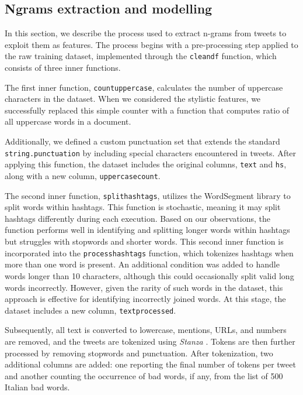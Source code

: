 \subsection{Ngrams extraction and modelling}
In this section, we describe the process used to extract n-grams from tweets to exploit them as features.
The process begins with a pre-processing step applied to the raw training dataset, implemented through the \texttt{clean\textunderscore df} function, which consists of three inner functions.

The first inner function, \texttt{count\textunderscore uppercase}, calculates the number of uppercase characters in the dataset.
When we considered the stylistic features, we successfully replaced this simple counter with a function that computes ratio of all uppercase words in a document.

Additionally, we defined a custom punctuation set that extends the standard \texttt{string.punctuation} by including special characters encountered in tweets.
After applying this function, the dataset includes the original columns, \texttt{text} and \texttt{hs}, along with a new column, \texttt{uppercase\textunderscore count}.

The second inner function, \texttt{split\textunderscore hashtags}, utilizes the WordSegment library to split words within hashtags. This function is stochastic, meaning it may split hashtags differently during each execution. Based on our observations, the function performs well in identifying and splitting longer words within hashtags but struggles with stopwords and shorter words. This second inner function is incorporated into the \texttt{process\textunderscore hashtags} function, which tokenizes hashtags when more than one word is present. An additional condition was added to handle words longer than 10 characters, although this could occasionally split valid long words incorrectly. However, given the rarity of such words in the dataset, this approach is effective for identifying incorrectly joined words.
At this stage, the dataset includes a new column, \texttt{text\textunderscore processed}.

Subsequently, all text is converted to lowercase, mentions, URLs, and numbers are removed, and the tweets are tokenized using \emph{Stanza} \cite{stanza}.
Tokens are then further processed by removing stopwords and punctuation.
After tokenization, two additional columns are added: one reporting the final number of tokens per tweet and another counting the occurrence of bad words, if any, from the list of 500 Italian bad words.

